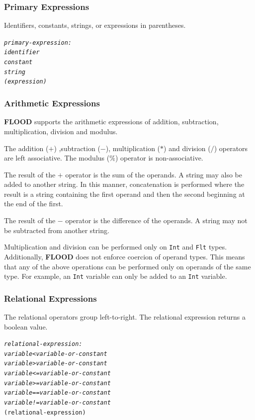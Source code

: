 \documentclass[12pt]{report}
\begin{document}
\subsubsection{Primary Expressions}

Identifiers, constants, strings, or expressions in parentheses.

\begin{alltt}\begin{singlespace}
         \textit{primary-expression:}
            \textit{identifier}
            \textit{constant}
            \textit{string}
            \textit{( expression )}\end{singlespace}
\end{alltt}

\subsubsection{Arithmetic Expressions}

\textbf{FLOOD} supports the arithmetic expressions of addition, subtraction, multiplication, division and modulus.

The addition ($+$) ,subtraction ($-$), multiplication ($*$) and division ($/$) operators are left associative. The modulus ($\%$) operator is non-associative.

The result of the $+$ operator is the sum of the operands. A string may also be added to another string. In this manner, concatenation is performed where the result is a string containing the first operand and then the second beginning at the end of the first.

The result of the $-$ operator is the difference of the operands. A string may not be subtracted from another string.

Multiplication and division can be performed only on \texttt{Int} and \texttt{Flt} types. Additionally, \textbf{FLOOD} does not enforce coercion of operand types. This means that any of the above operations can be performed only on operands of the same type. For example, an \texttt{Int} variable can only be added to an \texttt{Int} variable.

\subsubsection{Relational Expressions}

The relational operators group left-to-right. The relational expression returns a boolean value.

\begin{alltt}\begin{singlespace}
         \textit{relational-expression:}
            \textit{variable < variable-or-constant}
            \textit{variable > variable-or-constant}
            \textit{variable <= variable-or-constant}
            \textit{variable >= variable-or-constant}
            \textit{variable == variable-or-constant}
            \textit{variable != variable-or-constant}
            (relational-expression)\end{singlespace}
\end{alltt}
\end{document}
